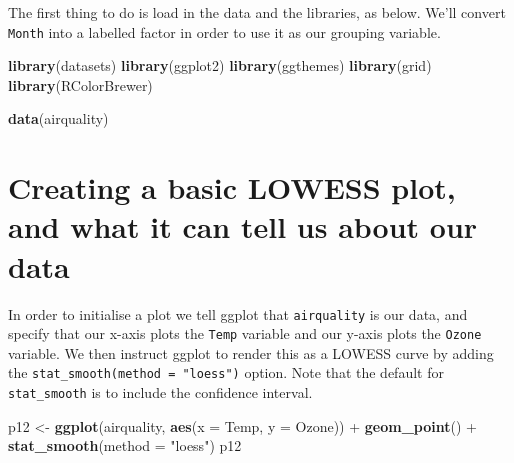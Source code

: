 \documentclass[]{article}
\newenvironment{Shaded}{\begin{snugshade}}{\end{snugshade}}
\newcommand{\KeywordTok}[1]{\textcolor[rgb]{0.13,0.29,0.53}{\textbf{{#1}}}}
\newcommand{\DataTypeTok}[1]{\textcolor[rgb]{0.13,0.29,0.53}{{#1}}}
\newcommand{\StringTok}[1]{\textcolor[rgb]{0.31,0.60,0.02}{{#1}}}
\newcommand{\NormalTok}[1]{{#1}}
\begin{document}
The first thing to do is load in the data and the libraries, as below.
We'll convert \texttt{Month} into a labelled factor in order to use it
as our grouping variable.

\begin{Shaded}
\begin{Highlighting}[]
\KeywordTok{library}\NormalTok{(datasets)}
\KeywordTok{library}\NormalTok{(ggplot2)}
\KeywordTok{library}\NormalTok{(ggthemes)}
\KeywordTok{library}\NormalTok{(grid)}
\KeywordTok{library}\NormalTok{(RColorBrewer)}

\KeywordTok{data}\NormalTok{(airquality)}
\end{Highlighting}
\end{Shaded}

\section{Creating a basic LOWESS plot, and what it can tell us about our
data}\label{creating-a-basic-lowess-plot-and-what-it-can-tell-us-about-our-data}

In order to initialise a plot we tell ggplot that \texttt{airquality} is
our data, and specify that our x-axis plots the \texttt{Temp} variable
and our y-axis plots the \texttt{Ozone} variable. We then instruct
ggplot to render this as a LOWESS curve by adding the
\texttt{stat\_smooth(method\ =\ "loess")} option. Note that the default
for \texttt{stat\_smooth} is to include the confidence interval.

\begin{Shaded}
\begin{Highlighting}[]
\NormalTok{p12 <-}\StringTok{ }\KeywordTok{ggplot}\NormalTok{(airquality, }\KeywordTok{aes}\NormalTok{(}\DataTypeTok{x =} \NormalTok{Temp, }\DataTypeTok{y =} \NormalTok{Ozone)) +}\StringTok{ }
\StringTok{  }\KeywordTok{geom_point}\NormalTok{() +}\StringTok{ }
\StringTok{  }\KeywordTok{stat_smooth}\NormalTok{(}\DataTypeTok{method =} \StringTok{"loess"}\NormalTok{)}
\NormalTok{p12}
\end{Highlighting}
\end{Shaded}
\end{document}
